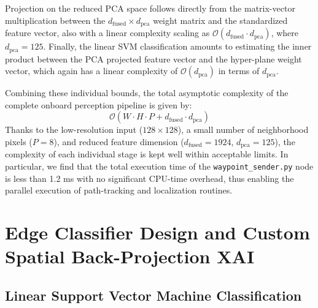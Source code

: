 Projection on the reduced PCA space follows directly from the matrix-vector multiplication between the $d_{\text{fused}} \times d_{\text{pca}}$ weight matrix and the standardized feature vector, also with a linear complexity scaling as $\mathcal{O}(d_{\text{fused}} \cdot d_{\text{pca}})$, where $d_{\text{pca}} = 125$. Finally, the linear SVM classification amounts to estimating the inner product between the PCA projected feature vector and the hyper-plane weight vector, which again has a linear complexity of $\mathcal{O}(d_{\text{pca}})$ in terms of $d_{\text{pca}}$.

Combining these individual bounds, the total asymptotic complexity of the complete onboard perception pipeline is given by:
\begin{equation}
\mathcal{O}(W \cdot H \cdot P + d_{\text{fused}} \cdot d_{\text{pca}}) \label{eq:total_pipeline_complexity}
\end{equation}
Thanks to the low-resolution input ($128 \times 128$), a small number of neighborhood pixels ($P = 8$), and reduced feature dimension ($d_{\text{fused}} = 1924$, $d_{\text{pca}} = 125$), the complexity of each individual stage is kept well within acceptable limits. In particular, we find that the total execution time of the \texttt{waypoint\_sender.py} node is less than 1.2 ms with no significant CPU-time overhead, thus enabling the parallel execution of path-tracking and localization routines.

\section{Edge Classifier Design and Custom Spatial Back-Projection XAI}

\subsection{Linear Support Vector Machine Classification}

